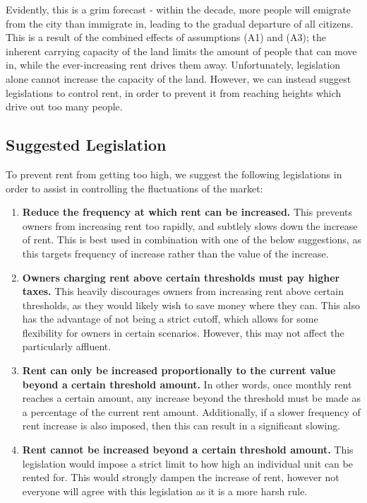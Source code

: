 \documentclass{article}
\begin{document}
Evidently, this is a grim forecast - within the decade, more people will emigrate from the city than
immigrate in, leading to the gradual departure of all citizens. This is a result of the combined
effects of assumptions (A1) and (A3); the inherent carrying capacity of the land limits the amount
of people that can move in, while the ever-increasing rent drives them away. Unfortunately,
legislation alone cannot increase the capacity of the land. However, we can instead suggest
legislations to control rent, in order to prevent it from reaching heights which drive out too many
people.

\subsection{Suggested Legislation}

To prevent rent from getting too high, we suggest the following legislations in order to assist in
controlling the fluctuations of the market:

\begin{enumerate}[label=(B\arabic*)]
    \item \textbf{Reduce the frequency at which rent can be increased.} This prevents owners from
        increasing rent too rapidly, and subtlely slows down the increase of rent. This is best
        used in combination with one of the below suggestions, as this targets frequency of increase
        rather than the value of the increase.
    \item \textbf{Owners charging rent above certain thresholds must pay higher taxes.} This
        heavily discourages owners from increasing rent above certain thresholds, as they would
        likely wish to save money where they can. This also has the advantage of not being a strict
        cutoff, which allows for some flexibility for owners in certain scenarios. However, this
        may not affect the particularly affluent.
    \item \textbf{Rent can only be increased proportionally to the current value beyond a certain
        threshold amount.} In other words, once monthly rent reaches a certain amount, any increase
        beyond the threshold must be made as a percentage of the current rent amount. Additionally,
        if a slower frequency of rent increase is also imposed, then this can result in a
        significant slowing.
    \item \textbf{Rent cannot be increased beyond a certain threshold amount.} This legislation
        would impose a strict limit to how high an individual unit can be rented for. This would
        strongly dampen the increase of rent, however not everyone will agree with this legislation
        as it is a more harsh rule.
\end{enumerate}
\end{document}
